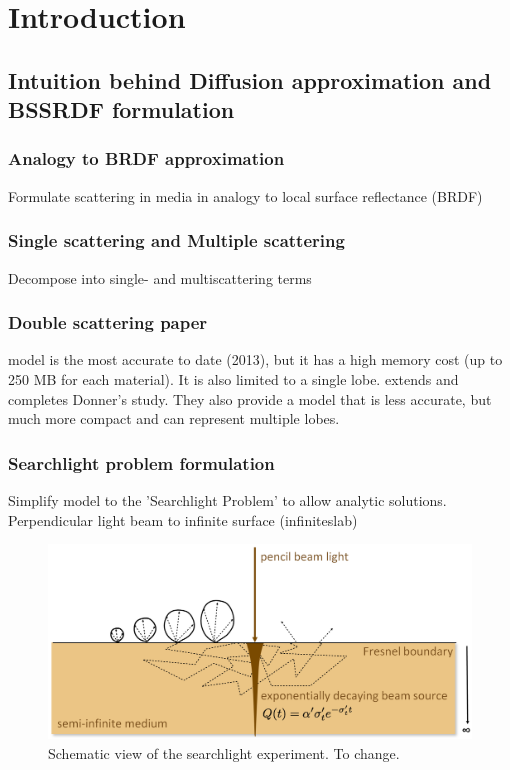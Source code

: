 \chapter{Introduction}
\label{chapter:introduction}







\section{Intuition behind Diffusion approximation and BSSRDF formulation}

\subsection{Analogy to BRDF approximation}
\label{section:BSSRDF_intuition}
Formulate scattering in media in analogy to local surface reflectance (BRDF)

\subsection{Single scattering and Multiple scattering}
Decompose into single- and multiscattering terms

\subsection{Double scattering paper}
\cite{Donner:2009:EBM} model is the most accurate to date (2013), but it has a
high memory cost (up to 250 MB for each material). It is also limited to a
single lobe. \cite{holzschuch:hal-00760054} extends and completes Donner's
study. They also provide a model that is less accurate, but much more compact
and can represent multiple lobes.

\subsection{Searchlight problem formulation}
\label{section:searchlight}
Simplify model to the 'Searchlight Problem' to allow analytic solutions.
Perpendicular light beam to infinite surface \cite{Jacques1995}
(\gls{infiniteslab}) \begin{figure}[h]
    \centering
    \includegraphics[width=\textwidth]{imgs/schemes/searchlight_disney}
    \caption{Schematic view of the searchlight experiment. To change.}
    \label{fig:searchlight_scheme}
\end{figure}

